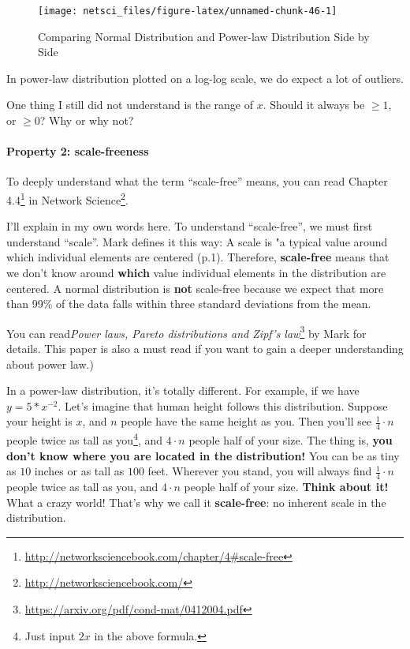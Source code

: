 \documentclass[
]{krantz}
\makeatletter
\renewcommand{\href}[2]{#2\footnote{\url{#1}}}
\newenvironment{kframe}{%
\medskip{}
\setlength{\fboxsep}{.8em}
 \def\at@end@of@kframe{}%
 \ifinner\ifhmode%
  \def\at@end@of@kframe{\end{minipage}}%
  \begin{minipage}{\columnwidth}%
 \fi\fi%
 \def\FrameCommand##1{\hskip\@totalleftmargin \hskip-\fboxsep
 \colorbox{shadecolor}{##1}\hskip-\fboxsep
     \hskip-\linewidth \hskip-\@totalleftmargin \hskip\columnwidth}%
 \MakeFramed {\advance\hsize-\width
   \@totalleftmargin\z@ \linewidth\hsize
   \@setminipage}}%
 {\par\unskip\endMakeFramed%
 \at@end@of@kframe}
\newenvironment{rmdblock}[1]
  {
  \begin{itemize}
  \renewcommand{\labelitemi}{
    \raisebox{-.7\height}[0pt][0pt]{
      {\setkeys{Gin}{width=3em,keepaspectratio}\texttt{[image: images/\#1]}}
    }
  }
  \setlength{\fboxsep}{1em}
  \begin{kframe}
  \item
  }
  {
  \end{kframe}
  \end{itemize}
  }
\newenvironment{rmdreminder}
  {\begin{rmdblock}{reminder}}
  {\end{rmdblock}}
\makeatother
\begin{document}
\begin{figure}

{\centering \texttt{[image: netsci\_files/figure-latex/unnamed-chunk-46-1]} 

}

\caption{Comparing Normal Distribution and Power-law Distribution Side by Side}\label{fig:unnamed-chunk-46}
\end{figure}

In power-law distribution plotted on a log-log scale, we do expect a lot of outliers.

\begin{rmdreminder}
One thing I still did not understand is the range of \(x\). Should it always be \(\ge 1\), or \(\ge 0\)? Why or why not?
\end{rmdreminder}

\hypertarget{property-2-scale-freeness}{%
\paragraph{Property 2: scale-freeness}\label{property-2-scale-freeness}}

To deeply understand what the term ``scale-free'' means, you can read \href{http://networksciencebook.com/chapter/4\#scale-free}{Chapter 4.4} in \href{http://networksciencebook.com/}{Network Science}.

I'll explain in my own words here. To understand ``scale-free'', we must first understand ``scale''. Mark \citet{newman2005power} defines it this way: A scale is "a typical value around which individual elements are centered (p.1). Therefore, \textbf{scale-free} means that we don't know around \textbf{which} value individual elements in the distribution are centered. A normal distribution is \textbf{not} scale-free because we expect that more than 99\% of the data falls within three standard deviations from the mean.

You can read\href{https://arxiv.org/pdf/cond-mat/0412004.pdf}{\emph{Power laws, Pareto distributions and Zipf's law}} by Mark \citet{newman2005power} for details. This paper is also a must read if you want to gain a deeper understanding about power law.)

In a power-law distribution, it's totally different. For example, if we have \(y = 5*x^{-2}\). Let's imagine that human height follows this distribution. Suppose your height is \(x\), and \(n\) people have the same height as you. Then you'll see \(\frac{1}{4} \cdot n\) people twice as tall as you\footnote{Just input \(2x\) in the above formula.}, and \(4 \cdot n\) people half of your size. The thing is, \textbf{you don't know where you are located in the distribution!} You can be as tiny as \(10\) inches or as tall as \(100\) feet. Wherever you stand, you will always find \(\frac{1}{4} \cdot n\) people twice as tall as you, and \(4 \cdot n\) people half of your size. \textbf{Think about it!} What a crazy world! That's why we call it \textbf{scale-free}: no inherent scale in the distribution.
\end{document}
